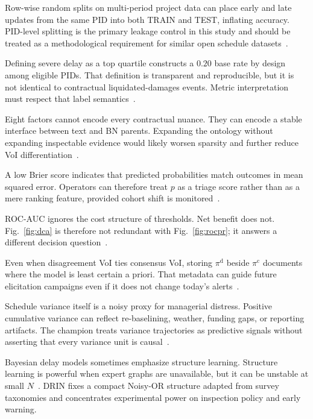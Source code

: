 Row-wise random splits on multi-period project data can place early and late updates from the same PID into both TRAIN and TEST, inflating accuracy. PID-level splitting is the primary leakage control in this study and should be treated as a methodological requirement for similar open schedule datasets~\cite{Tagharobi2025,Egwim2021}.

Defining severe delay as a top quartile constructs a $0.20$ base rate by design among eligible PIDs. That definition is transparent and reproducible, but it is not identical to contractual liquidated-damages events. Metric interpretation must respect that label semantics~\cite{Saito2015,Hand2009,Flyvbjerg2009}.

Eight factors cannot encode every contractual nuance. They can encode a stable interface between text and BN parents. Expanding the ontology without expanding inspectable evidence would likely worsen sparsity and further reduce VoI differentiation~\cite{Onisko2001,Luu2009}.

A low Brier score indicates that predicted probabilities match outcomes in mean squared error. Operators can therefore treat $p$ as a triage score rather than as a mere ranking feature, provided cohort shift is monitored~\cite{Brier1950,Murphy1973,Gneiting2007}.

ROC-AUC ignores the cost structure of thresholds. Net benefit does not. Fig.~\ref{fig:dca} is therefore not redundant with Fig.~\ref{fig:rocpr}; it answers a different decision question~\cite{Vickers2006,Hand2009}.

Even when disagreement VoI ties consensus VoI, storing $\pi^{\mathrm{d}}$ beside $\pi^{\mathrm{c}}$ documents where the model is least certain a priori. That metadata can guide future elicitation campaigns even if it does not change today's alerts~\cite{Khodabakhshian2025,Memarzadeh2016}.

Schedule variance itself is a noisy proxy for managerial distress. Positive cumulative variance can reflect re-baselining, weather, funding gaps, or reporting artifacts. The champion treats variance trajectories as predictive signals without asserting that every variance unit is causal~\cite{Gneiting2007,Kim2016,Nasir2003}.

Bayesian delay models sometimes emphasize structure learning. Structure learning is powerful when expert graphs are unavailable, but it can be unstable at small $N$~\cite{Zhang2021BNMCS,Khodabakhshian2025}. DRIN fixes a compact Noisy-OR structure adapted from survey taxonomies and concentrates experimental power on inspection policy and early warning.

